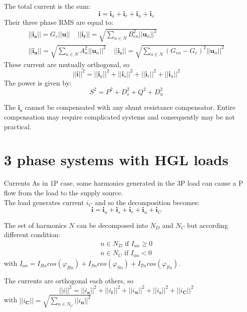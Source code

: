 \documentclass[aspectratio=169]{beamer}
\begin{document}
  \begin{frame}
    The total current is the sum:
    \begin{equation}
      \pmb{i} = \pmb{i}_a + \pmb{i}_r + \pmb{i}_u + \pmb{i}_s
    \end{equation}
    Their three phase RMS are equal to:
    \begin{gather}
      ||\pmb{i_a}||=G_e ||\pmb{u}||\ \ \ \ \ 
      ||\pmb{i_r}||=\sqrt{\sum_{n\in N}B_{en}^2||\pmb{u}_n||^2}\\
      ||\pmb{i_u}||=\sqrt{\sum_{n\in N}A_{n}^2||\pmb{u}_n||^2}\ \ \ \ \
      ||\pmb{i_s}||=\sqrt{\sum_{n\in N}(G_{en}-G_e)^2||\pmb{u}_n||^2}
    \end{gather}
    These current are mutually orthogonal, so 
    \begin{equation}
      ||\pmb{i}||^2 = ||\pmb{i}_a||^2 + ||\pmb{i}_s||^2 + ||\pmb{i}_r||^2 + ||\pmb{i}_u||^2
    \end{equation}
    The power is given by:
    \begin{equation}
      S^2 = P^2 + D_s^2 + Q^2 + D_u^2 
    \end{equation}

    The $\pmb{i_s}$ cannot be compensated with any shunt resistance compensator. Entire compensation may require complicated systems and consequently may be not practical.
  \end{frame}

\section{3 phase systems with HGL loads}
  \begin{frame}{Currents}{\insertsection}
    As in 1P case, some harmonics generated in the 3P load can cause a P flow from the load to the supply source. \\
    The load generates current $i_C$ and so the decomposition becomes:
    \begin{equation}
      \pmb{i}=\pmb{i}_a + \pmb{i}_s + \pmb{i}_r + \pmb{i}_u  + \pmb{i}_C
    \end{equation}

    The set of harmonics $N$ can be decomposed into $N_D$ and $N_C$ but according different condition:
    \begin{gather}
      n \in N_D \text{ if } I_{an} \ge 0\\
      n \in N_C \text{ if } I_{an}< 0
    \end{gather}
    with $I_{an}=I_{Rn}cos(\varphi_{Rn}) + I_{Sn}cos(\varphi_{Sn}) + I_{Tn}cos(\varphi_{Tn})$.
    
    The currents are orthogonal each others, so
    \begin{equation}
      ||\pmb{\mathit{i}}||^2 = ||\pmb{\mathit{i}_a}||^2 + ||\pmb{\mathit{i}_r}||^2 + ||\pmb{\mathit{i}_u}||^2 + ||\pmb{\mathit{i}_s}||^2 + ||\pmb{\mathit{i}_C}||^2
    \end{equation}
    with $||\pmb{\mathit{i}_C}||=\sqrt{\sum_{n\in N_C}||\pmb{\mathit{i}_n}||^2}$
  \end{frame}
\end{document}
